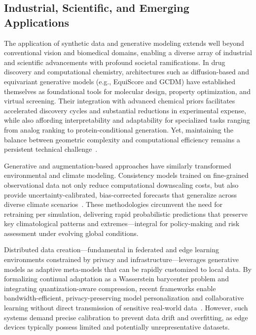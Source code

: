 \documentclass[sigconf]{acmart}
\begin{document}
\subsection{Industrial, Scientific, and Emerging Applications}

The application of synthetic data and generative modeling extends well beyond conventional vision and biomedical domains, enabling a diverse array of industrial and scientific advancements with profound societal ramifications. In drug discovery and computational chemistry, architectures such as diffusion-based and equivariant generative models (e.g., EquiScore and GCDM) have established themselves as foundational tools for molecular design, property optimization, and virtual screening. Their integration with advanced chemical priors facilitates accelerated discovery cycles and substantial reductions in experimental expense, while also affording interpretability and adaptability for specialized tasks ranging from analog ranking to protein-conditional generation. Yet, maintaining the balance between geometric complexity and computational efficiency remains a persistent technical challenge~\cite{ref59,ref74}.

Generative and augmentation-based approaches have similarly transformed environmental and climate modeling. Consistency models trained on fine-grained observational data not only reduce computational downscaling costs, but also provide uncertainty-calibrated, bias-corrected forecasts that generalize across diverse climate scenarios~\cite{ref73}. These methodologies circumvent the need for retraining per simulation, delivering rapid probabilistic predictions that preserve key climatological patterns and extremes—integral for policy-making and risk assessment under evolving global conditions.

Distributed data creation—fundamental in federated and edge learning environments constrained by privacy and infrastructure—leverages generative models as adaptive meta-models that can be rapidly customized to local data. By formalizing continual adaptation as a Wasserstein barycenter problem and integrating quantization-aware compression, recent frameworks enable bandwidth-efficient, privacy-preserving model personalization and collaborative learning without direct transmission of sensitive real-world data~\cite{ref72}. However, such systems demand precise calibration to prevent data drift and overfitting, as edge devices typically possess limited and potentially unrepresentative datasets.
\end{document}
